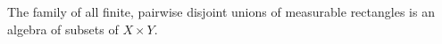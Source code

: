 The family of all finite, pairwise disjoint unions of measurable rectangles is an algebra of subsets of $X \times Y$.
